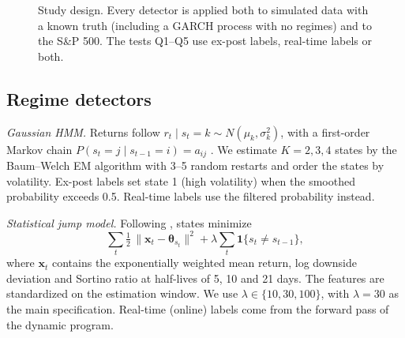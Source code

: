 \documentclass[conference]{IEEEtran}
\begin{document}
\begin{figure}[t]
\caption{Study design. Every detector is applied both to simulated data with a known truth (including a GARCH process with no regimes) and to the S\&P 500. The tests Q1--Q5 use ex-post labels, real-time labels or both.}
\label{fig:flow}
\end{figure}

\subsection{Regime detectors}
\emph{Gaussian HMM.} Returns follow $r_t \mid s_t = k \sim N(\mu_k, \sigma_k^2)$, with a first-order Markov chain $P(s_t = j \mid s_{t-1} = i) = a_{ij}$ \cite{hamilton1989}. We estimate $K = 2, 3, 4$ states by the Baum--Welch EM algorithm with 3--5 random restarts and order the states by volatility. Ex-post labels set state 1 (high volatility) when the smoothed probability exceeds 0.5. Real-time labels use the filtered probability instead.

\emph{Statistical jump model.} Following \cite{nystrup2020, shu2024}, states minimize
\begin{equation}
\sum_{t} \tfrac{1}{2}\,\lVert \bm{x}_t - \bm{\theta}_{s_t} \rVert^2 + \lambda \sum_{t} \mathbf{1}\{s_t \neq s_{t-1}\},
\end{equation}
where $\bm{x}_t$ contains the exponentially weighted mean return, log downside deviation and Sortino ratio at half-lives of 5, 10 and 21 days. The features are standardized on the estimation window. We use $\lambda \in \{10, 30, 100\}$, with $\lambda = 30$ as the main specification. Real-time (online) labels come from the forward pass of the dynamic program.
\end{document}
